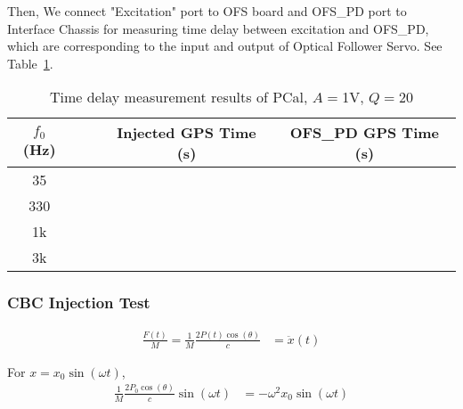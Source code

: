 \noindent
Then, We connect "Excitation" port to OFS board and OFS\_PD port to Interface Chassis for measuring time delay between excitation and OFS\_PD, which are corresponding to the input and output of Optical Follower Servo. See Table~\ref{tab:timedelay}.

\begin{table}[htbp]
   \centering
   \begin{tabular}{ ccrcc } %
      \toprule
       $f_0$ (Hz) &    & & Injected GPS Time (s) & OFS\_PD GPS Time (s) \\
      \midrule
        35  &    &    &   &\\
        330 &    &    &   &\\
        1k  &    &    &   &\\
        3k  &    &    &   &\\
      \bottomrule
   \end{tabular}
   \caption{Time delay measurement results of PCal, $A=$1V, $Q=$20}
   \label{tab:timedelay}
\end{table}




\pagebreak
\subsubsection{CBC Injection Test}


\begin{align}
    \frac{F(t)}{M}=\frac{1}{M} \frac{2 P(t) \cos(\theta)}{c} &= \ddot{x}(t)
\end{align}

For $x=x_0 \sin(\omega t)$,
\begin{align}
    \frac{1}{M} \frac{2 P_0 \cos(\theta)}{c} \sin(\omega t) &=  -\omega^2 x_0 \sin(\omega t)
\end{align}


